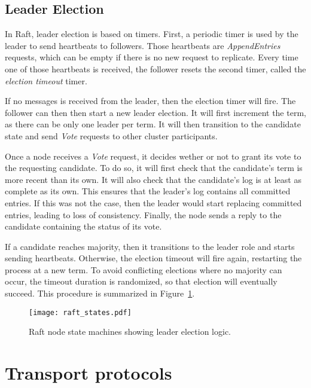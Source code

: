 \subsection{Leader Election}

In Raft, leader election is based on timers.
First, a periodic timer is used by the leader to send heartbeats to followers.
Those heartbeats are \emph{AppendEntries} requests, which can be empty if there is no new request to replicate.
Every time one of those heartbeats is received, the follower resets the second timer, called the \emph{election timeout} timer.

If no messages is received from the leader, then the election timer will fire.
The follower can then then start a new leader election.
It will first increment the term, as there can be only one leader per term.
It will then transition to the candidate state and send \emph{Vote} requests to other cluster participants.

Once a node receives a \emph{Vote} request, it decides wether or not to grant its vote to the requesting candidate.
To do so, it will first check that the candidate's term is more recent than its own.
It will also check that the candidate's log is at least as complete as its own.
This ensures that the leader's log contains all committed entries.
If this was not the case, then the leader would start replacing committed entries, leading to loss of consistency.
Finally, the node sends a reply to the candidate containing the status of its vote.

If a candidate reaches majority, then it transitions to the leader role and starts sending heartbeats.
Otherwise, the election timeout will fire again, restarting the process at a new term.
To avoid conflicting elections where no majority can occur, the timeout duration is randomized, so that election will eventually succeed.
This procedure is summarized in Figure~\ref{fig:raft-leader-election}.


\begin{figure}[h]
    \centering
    \texttt{[image: raft\_states.pdf]}
    \caption{Raft node state machines showing leader election logic.
    \label{fig:raft-leader-election}
    }
\end{figure}


\section{Transport protocols}


